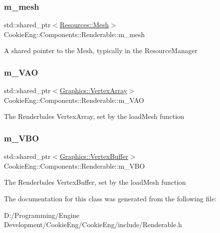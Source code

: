 \subsubsection{\texorpdfstring{m\+\_\+mesh}{m\_mesh}}
{\footnotesize\ttfamily std\+::shared\+\_\+ptr$<$\hyperlink{struct_cookie_eng_1_1_resources_1_1_mesh}{Resources\+::\+Mesh}$>$ Cookie\+Eng\+::\+Components\+::\+Renderable\+::m\+\_\+mesh\hspace{0.3cm}{\ttfamily [protected]}}

A shared pointer to the Mesh, typically in the Resource\+Manager \mbox{\label{class_cookie_eng_1_1_components_1_1_renderable_ad9486a5a4befa25f74fe9e4d553f2ce6}} 
\subsubsection{\texorpdfstring{m\+\_\+\+V\+AO}{m\_VAO}}
{\footnotesize\ttfamily std\+::shared\+\_\+ptr$<$\hyperlink{class_cookie_eng_1_1_graphics_1_1_vertex_array}{Graphics\+::\+Vertex\+Array}$>$ Cookie\+Eng\+::\+Components\+::\+Renderable\+::m\+\_\+\+V\+AO\hspace{0.3cm}{\ttfamily [protected]}}

The Renderbales Vertex\+Array, set by the load\+Mesh function \mbox{\label{class_cookie_eng_1_1_components_1_1_renderable_a09cf84ce90d1e6474a0e89f035f74b7c}} 
\subsubsection{\texorpdfstring{m\+\_\+\+V\+BO}{m\_VBO}}
{\footnotesize\ttfamily std\+::shared\+\_\+ptr$<$\hyperlink{class_cookie_eng_1_1_graphics_1_1_vertex_buffer}{Graphics\+::\+Vertex\+Buffer}$>$ Cookie\+Eng\+::\+Components\+::\+Renderable\+::m\+\_\+\+V\+BO\hspace{0.3cm}{\ttfamily [protected]}}

The Renderbales Vertex\+Buffer, set by the load\+Mesh function 

The documentation for this class was generated from the following file\+:\begin{DoxyCompactItemize}
\item 
D\+:/\+Programming/\+Engine Development/\+Cookie\+Eng/\+Cookie\+Eng/include/Renderable.\+h\end{DoxyCompactItemize}
